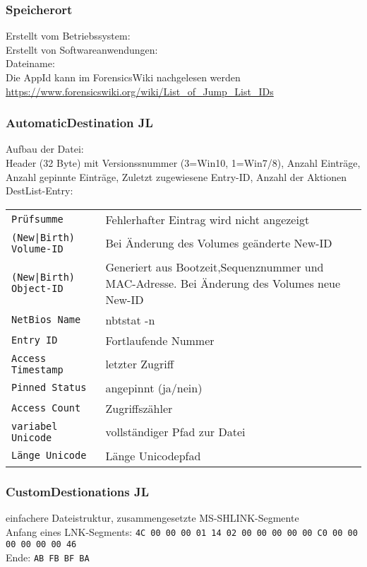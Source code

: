 \begin{multicols}{3}
\subsubsection{Speicherort}
Erstellt vom Betriebssystem: \\
Erstellt von Softwareanwendungen: \\
Dateiname: \\
Die AppId kann im ForensicsWiki nachgelesen werden \url{https://www.forensicswiki.org/wiki/List_of_Jump_List_IDs}

\subsubsection{AutomaticDestination JL}
Aufbau der Datei:\\
Header (32 Byte) mit Versionssnummer (3=Win10, 1=Win7/8), Anzahl Einträge, Anzahl gepinnte Einträge, Zuletzt zugewiesene Entry-ID, Anzahl der Aktionen\\
DestList-Entry:\\
\begin{tabular}{@{}p{\the\MyLen}%
		@{}p{\linewidth-\the\MyLen}@{}}
	\texttt{Prüfsumme} &  Fehlerhafter Eintrag wird nicht angezeigt\\
	\texttt{(New|Birth) Volume-ID} &  Bei Änderung des Volumes geänderte New-ID\\
	\texttt{(New|Birth) Object-ID} &  Generiert aus Bootzeit,Sequenznummer und MAC-Adresse. Bei Änderung des Volumes neue New-ID\\
	\texttt{NetBios Name} & nbtstat -n\\
	\texttt{Entry ID} & Fortlaufende Nummer\\
	\texttt{Access Timestamp} & letzter Zugriff \\
	\texttt{Pinned Status} & angepinnt (ja/nein)\\
	\texttt{Access Count} & Zugriffszähler\\
	\texttt{variabel Unicode} & vollständiger Pfad zur Datei\\
	\texttt{Länge Unicode} & Länge Unicodepfad\\
\end{tabular}

\subsubsection{CustomDestionations JL}
einfachere Dateistruktur, zusammengesetzte MS-SHLINK-Segmente\\
Anfang eines LNK-Segments: \texttt{4C 00 00 00 01 14 02 00 00 00 00 00 C0 00 00 00 00 00 00 46}\\
Ende: \texttt{AB FB BF BA}


\end{multicols}
